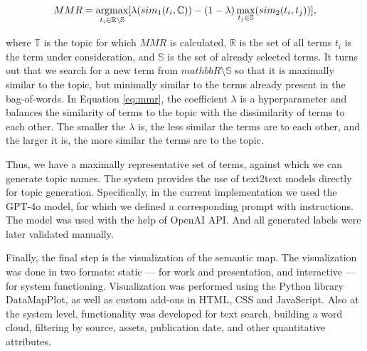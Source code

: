 \begin{equation}\label{eq:mmr}
    MMR =
    \argmax_{
        t_i \in \mathbb{R} \setminus \mathbb{S}
    }[
        \lambda(sim_1(t_i,\mathbb{C})) - (1 - \lambda)\max_{t_j \in \mathbb{S}}(sim_2(t_i, t_j))
    ],
\end{equation}

where $\mathbb{T}$ is the topic for which $MMR$ is calculated, $\mathbb{R}$ is the set of all terms
$t_i$ is the term under consideration, and $\mathbb{S}$ is the set of already selected terms.
It turns out that we search for a new term from $mathbb{R} \setminus \mathbb{S}$ so that it is
maximally similar to the topic, but minimally similar to the terms already present in the bag-of-words.
In Equation \ref{eq:mmr}, the coefficient $\lambda$ is a hyperparameter and balances the similarity
of terms to the topic with the dissimilarity of terms to each other. The smaller the $\lambda$ is,
the less similar the terms are to each other, and the larger it is, the more similar the terms are
to the topic.

Thus, we have a maximally representative set of terms, against which we can generate topic names.
The system provides the use of text2text models directly for topic generation. Specifically,
in the current implementation we used the GPT-4o model, for which we defined a corresponding prompt
with instructions. The model was used with the help of OpenAI API. And all generated labels were
later validated manually.

Finally, the final step is the visualization of the semantic map. The visualization was done
in two formats: static --- for work and presentation, and interactive --- for system functioning.
Visualization was performed using the Python library DataMapPlot, as well as custom add-ons in
HTML, CSS and JavaScript. Also at the system level, functionality was developed for text search,
building a word cloud, filtering by source, assets, publication date, and other quantitative
attributes.